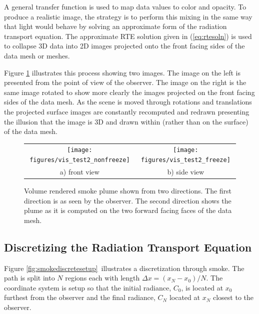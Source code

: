 A general transfer function is used to map data values to color and opacity. To produce a realistic image, the strategy is to perform this mixing in the same way that light would behave by solving an approximate form of the radiation transport equation.  The approximate RTE solution given in (\ref{eq:rtesoln})  is used to collapse 3D data into 2D images projected onto the front facing sides of the data mesh or meshes.

Figure \ref{fig:volplume_example} illustrates this process showing two images.  The image on the left is presented from the point of view of the observer.  The image on the right is the same image rotated to show more clearly the images projected on the front facing sides of the data mesh.  As the scene is moved through rotations and translations the projected surface images are constantly recomputed and redrawn presenting the illusion that the image is 3D and drawn within (rather than on the surface) of the data mesh.

\begin{figure}[\figoptions]
\begin{center}
\begin{tabular}{cc}
\texttt{[image: figures/vis\_test2\_nonfreeze]}&
\texttt{[image: figures/vis\_test2\_freeze]}\\
a) front view&b) side view\\
\end{tabular}
\end{center}
\caption[Volume rendered smoke plume shown from two directions.]{Volume rendered smoke plume shown from two directions.
The first direction is as seen by the observer.  The second direction shows the plume as it is computed on the two forward facing faces of the data mesh.
}
\label{fig:volplume_example}
\end{figure}

\subsection{Discretizing the Radiation Transport Equation}
\newcommand{\htau}[1]{\tau_{#1}^{N-1}}
\newcommand{\halpha}[1]{\alpha_{#1}^{N-1}}
\newcommand{\sigai}[1]{\sigma_{a,#1}}
\newcommand{\Lei}[1]{C_{e,#1}}
\newcommand{\Lhatj}[1]{C_{#1}^N}
\newcommand{\Lhatjj}[1]{\hat{C}_{#1}^N}
\newcommand{\Chatjj}[1]{\hat{C}_{#1}^N}
\newcommand{\Leii}[1]{\hat{C}_{e,#1}}


Figure \ref{fig:smokediscretesetup}\ illustrates a discretization through  smoke.  The path is split into $N$ regions each with length $\Delta x=(x_N-x_0)/N$.  The coordinate system is setup so that the initial radiance, $C_0$, is located at $x_0$ furthest from the observer and the final radiance, $C_N$ located at $x_N$ closest to the observer.

